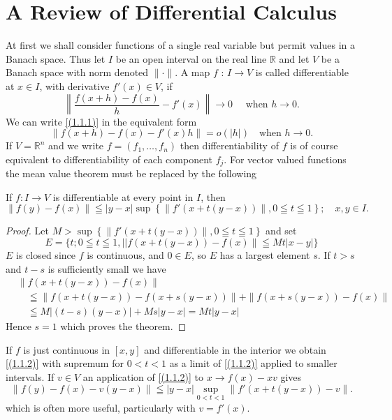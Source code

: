 \section{A Review of Differential Calculus}
At first we shall consider functions of a single real variable but permit values in a Banach space. Thus let $I$ be an open interval on the real line $\mathbb{R}$ and let $V$ be a Banach space with norm denoted $\|\cdot \|$. A map $f$ : $I \rightarrow V$ is called differentiable at $x \in I$, with derivative $f'(x) \in V$, if
\begin{equation}
	\label{(1.1.1)}
	\left\| \frac{f(x+h)-f(x)}{h}-f'(x)\right\| \rightarrow 0 \quad \text { when } h \rightarrow 0.
\end{equation}
We can write \eqref{(1.1.1)} in the equivalent form
\begin{equation}
	\label{(1.1.1)'}
	\left\|f(x+h)-f(x)-f'(x) h\right\|=o(|h|) \quad \text{when } h \rightarrow 0.
\end{equation}
If $V=\mathbb{R}^{n}$ and we write $f=\left(f_{1}, \ldots, f_{n}\right)$ then differentiability of $f$ is of course equivalent to differentiability of each component $f_{j}$. For vector
valued functions the mean value theorem must be replaced by the following
\begin{theorem}
	If $f: I \rightarrow V$ is differentiable at every point in $I$, then
	\begin{equation}
		\label{(1.1.2)}
		\|f(y)-f(x)\| \leqq|y-x| \sup \left\{\left\|f'(x+t(y-x))\right\|, 0 \leqq t \leqq 1\right\}; \quad x, y \in I.
	\end{equation}
\end{theorem}
\begin{proof}
	Let $M>\sup \left\{\left\|f'(x+t(y-x))\right\|, 0 \leqq t \leqq 1\right\}$ and set
	\[
		E=\{t ; 0 \leqq t \leqq 1,|| f(x+t(y-x))-f(x) \| \leqq M t|x-y|\}
	\]
	$E$ is closed since $f$ is continuous, and $0 \in E$, so $E$ has a largest element $s$. If $t>s$ and $t-s$ is sufficiently small we have
	\[
		\begin{aligned}
			 & \|f(x+t(y-x))-f(x)\|                                            \\
			 & \quad \leqq\|f(x+t(y-x))-f(x+s(y-x))\| + \| f(x+s(y-x))-f(x) \| \\
			 & \quad \leqq M|(t-s)(y-x)|+M s|y-x|=M t|y-x|
		\end{aligned}
	\]
	Hence $s=1$ which proves the theorem.
\end{proof}
\begin{remark}
	If $f$ is just continuous in $[x, y]$ and differentiable in the interior we obtain \eqref{(1.1.2)} with supremum for $0<t<1$ as a limit of \eqref{(1.1.2)} applied to smaller intervals. If $v \in V$ an application of \eqref{(1.1.2)} to $x \rightarrow f(x)-x v$ gives
	\begin{equation}
		\label{(1.1.2)'}
		\|f(y)-f(x)-v(y-x)\| \leqq|y-x| \sup _{0<t<1}\left\|f'(x+t(y-x))-v\right\|.
	\end{equation}
	which is often more useful, particularly with $v=f'(x)$.
\end{remark}

